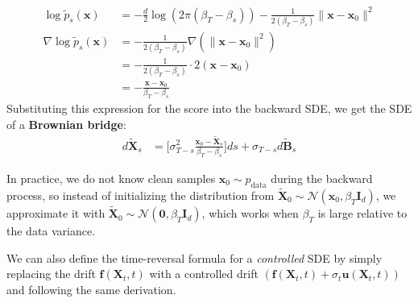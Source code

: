 \documentclass{article}
\begin{document}
{\begin{small}
\begin{align}
    \log \tilde{p}_s(\boldsymbol{x})&=-\frac{d}{2}\log(2\pi(\beta_T-\beta_s))-\frac{1}{2(\beta_T-\beta_s)}\|\boldsymbol{x}-\boldsymbol{x}_0\|^2\nonumber\\
    \nabla \log \tilde{p}_s(\boldsymbol{x})&=-\frac{1}{2(\beta_T-\beta_s)}\nabla \left(\|\boldsymbol{x}-\boldsymbol{x}_0\|^2\right)\nonumber\\
    &=-\frac{1}{2(\beta_T-\beta_s)}\cdot2(\boldsymbol{x}-\boldsymbol{x}_0)\nonumber\\
    &=-\frac{\boldsymbol{x}-\boldsymbol{x}_0}{\beta_T-\beta_s}
\end{align}
Substituting this expression for the score into the backward SDE, we get the SDE of a \textbf{Brownian bridge}:
\begin{align}
    d\tilde{\boldsymbol{X}}_s&=\bigg[\sigma_{T-s}^2\frac{\boldsymbol{x}_0-\tilde{\boldsymbol{X}}_s}{\beta_T-\beta_s}\bigg]ds+\sigma_{T-s}d\widetilde{\boldsymbol{B}}_s
\end{align}
\end{small}
\noindent In practice, we do not know clean samples $\boldsymbol{x}_0\sim p_{\text{data}}$ during the backward process, so instead of initializing the distribution from $\tilde{\boldsymbol{X}}_0\sim \mathcal{N}(\boldsymbol{x}_0, \beta_T\boldsymbol{I}_d)$, we approximate it with $\tilde{\boldsymbol{X}}_0\sim \mathcal{N}(\boldsymbol{0}, \beta_T\boldsymbol{I}_d)$, which works when $\beta_T$ is large relative to the data variance. 
}

We can also define the time-reversal formula for a \textit{controlled} SDE by simply replacing the drift $\boldsymbol{f}(\boldsymbol{X}_t,t)$ with a controlled drift $(\boldsymbol{f}(\boldsymbol{X}_t,t)+ \sigma_t\boldsymbol{u}(\boldsymbol{X}_t,t))$ and following the same derivation. 
\end{document}
